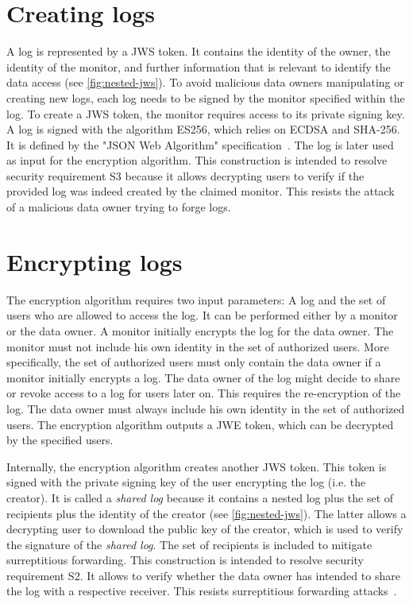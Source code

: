 \documentclass[../main.tex]{subfiles}
\begin{document}
\section{Creating logs}
\label{sec:signing}
A log is represented by a JWS token.
It contains the identity of the owner, the identity of the monitor, and further information that is relevant to identify the data access (see \cref{fig:nested-jws}).
To avoid malicious data owners manipulating or creating new logs, each log needs to be signed by the monitor specified within the log.
To create a JWS token, the monitor requires access to its private signing key.
A log is signed with the algorithm ES256, which relies on ECDSA and SHA-256.
It is defined by the "JSON Web Algorithm" specification~\cite{JWA2015}.
The log is later used as input for the encryption algorithm.
This construction is intended to resolve security requirement S3 because it allows decrypting users to verify if the provided log was indeed created by the claimed monitor.
This resists the attack of a malicious data owner trying to forge logs.

\section{Encrypting logs}\label{sec:encrypting}

The encryption algorithm requires two input parameters: A log and the set of users who are allowed to access the log.
It can be performed either by a monitor or the data owner.
A monitor initially encrypts the log for the data owner.
The monitor must not include his own identity in the set of authorized users.
More specifically, the set of authorized users must only contain the data owner if a monitor initially encrypts a log.
The data owner of the log might decide to share or revoke access to a log for users later on.
This requires the re-encryption of the log.
The data owner must always include his own identity in the set of authorized users.
The encryption algorithm outputs a JWE token, which can be decrypted by the specified users.

Internally, the encryption algorithm creates another JWS token.
This token is signed with the private signing key of the user encrypting the log (i.e. the creator).
It is called a \emph{shared log} because it contains a nested log plus the set of recipients plus the identity of the creator (see \cref{fig:nested-jws}).
The latter allows a decrypting user to download the public key of the creator, which is used to verify the signature of the \emph{shared log}.
The set of recipients is included to mitigate surreptitious forwarding.
This construction is intended to resolve security requirement S2.
It allows to verify whether the data owner has intended to share the log with a respective receiver.
This resists surreptitious forwarding attacks~\cite{Davis2001}.
\end{document}
